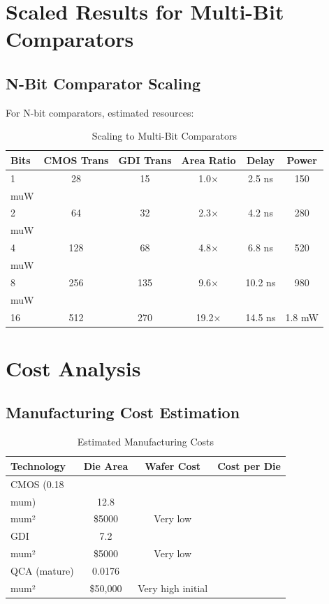 \documentclass[12pt,a4paper,twoside]{report}
\begin{document}
\begin{appendices}
\section{Scaled Results for Multi-Bit Comparators}

\subsection{N-Bit Comparator Scaling}

For N-bit comparators, estimated resources:

\begin{table}[H]
\centering
\caption{Scaling to Multi-Bit Comparators}
\label{tab:scaling}
\begin{tabularx}{\textwidth}{lccccc}
\toprule
Bits & CMOS Trans & GDI Trans & Area Ratio & Delay & Power \\
\midrule
1 & 28 & 15 & 1.0× & 2.5 ns & 150 \\muW \\
2 & 64 & 32 & 2.3× & 4.2 ns & 280 \\muW \\
4 & 128 & 68 & 4.8× & 6.8 ns & 520 \\muW \\
8 & 256 & 135 & 9.6× & 10.2 ns & 980 \\muW \\
16 & 512 & 270 & 19.2× & 14.5 ns & 1.8 mW \\
\bottomrule
\end{tabularx}
\end{table}

\section{Cost Analysis}

\subsection{Manufacturing Cost Estimation}

\begin{table}[H]
\centering
\caption{Estimated Manufacturing Costs}
\label{tab:cost}
\begin{tabularx}{\textwidth}{lccc}
\toprule
Technology & Die Area & Wafer Cost & Cost per Die \\
\midrule
CMOS (0.18 \\mum) & 12.8 \\mum² & \$5000 & Very low \\
GDI & 7.2 \\mum² & \$5000 & Very low \\
QCA (mature) & 0.0176 \\mum² & \$50,000 & Very high initial \\
\bottomrule
\end{tabularx}
\end{table}


\end{appendices}
\end{document}
